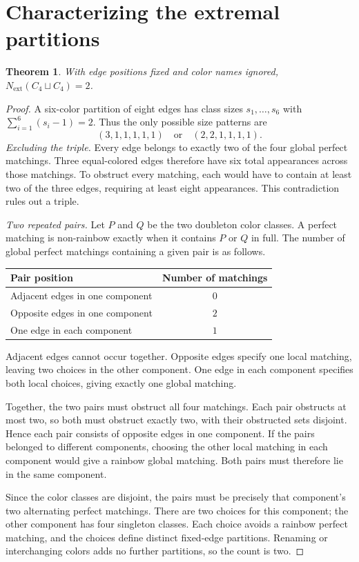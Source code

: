 \documentclass[11pt,letterpaper]{article}
\newtheorem{theorem}{Theorem}
\newcommand{\Next}{N_{\mathrm{ext}}}
\begin{document}
\section{Characterizing the extremal partitions}
\begin{theorem}\label{thm:squares-count}
With edge positions fixed and color names ignored,
$\Next(C_4\sqcup C_4)=2$.
\end{theorem}

\begin{proof}
A six-color partition of eight edges has class sizes $s_1,\dots,s_6$ with
$\sum_{i=1}^{6}(s_i-1)=2$. Thus the only possible size patterns are
\[
  (3,1,1,1,1,1)
  \quad\text{or}\quad
  (2,2,1,1,1,1).
\]
\emph{Excluding the triple.}
Every edge belongs to exactly two of the four global perfect matchings.
Three equal-colored edges therefore have six total appearances across
those matchings. To obstruct every matching, each would have to contain
at least two of the three edges, requiring at least eight appearances.
This contradiction rules out a triple.

\newpage
\noindent\emph{Two repeated pairs.}
Let $P$ and $Q$ be the two doubleton color classes. A perfect matching is
non-rainbow exactly when it contains $P$ or $Q$ in full. The number of
global perfect matchings containing a given pair is as follows.

\begin{center}
\renewcommand{\arraystretch}{1.15}
\begin{tabular}{@{}lc@{}}
\toprule
Pair position & Number of matchings \\
\midrule
Adjacent edges in one component & $0$ \\
Opposite edges in one component & $2$ \\
One edge in each component & $1$ \\
\bottomrule
\end{tabular}
\end{center}

Adjacent edges cannot occur together. Opposite edges specify one local
matching, leaving two choices in the other component. One edge in each
component specifies both local choices, giving exactly one global matching.

Together, the two pairs must obstruct all four matchings. Each pair
obstructs at most two, so both must obstruct exactly two, with their
obstructed sets disjoint. Hence each pair consists of opposite edges in
one component. If the pairs belonged to different components, choosing
the other local matching in each component would give a rainbow global
matching. Both pairs must therefore lie in the same component.

Since the color classes are disjoint, the pairs must be precisely that
component's two alternating perfect matchings. There are two choices for
this component; the other component has four singleton classes. Each
choice avoids a rainbow perfect matching, and the choices define distinct
fixed-edge partitions. Renaming or interchanging colors adds no further
partitions, so the count is two.
\end{proof}
\end{document}
